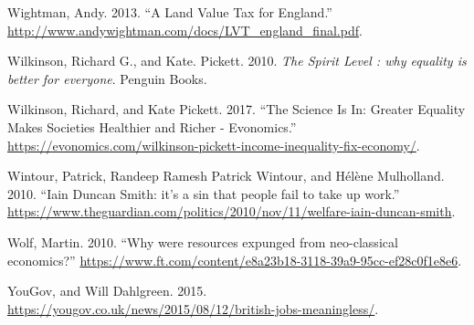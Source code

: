 \documentclass[]{tufte-handout}
\begin{document}
\leavevmode\hypertarget{ref-Wightman2013}{}%
Wightman, Andy. 2013. ``A Land Value Tax for England.''
\url{http://www.andywightman.com/docs/LVT_england_final.pdf}.

\leavevmode\hypertarget{ref-Wilkinson2010}{}%
Wilkinson, Richard G., and Kate. Pickett. 2010. \emph{The Spirit Level :
why equality is better for everyone}. Penguin Books.

\leavevmode\hypertarget{ref-Wilkinson2017}{}%
Wilkinson, Richard, and Kate Pickett. 2017. ``The Science Is In: Greater
Equality Makes Societies Healthier and Richer - Evonomics.''
\url{https://evonomics.com/wilkinson-pickett-income-inequality-fix-economy/}.

\leavevmode\hypertarget{ref-PatrickWintour2010}{}%
Wintour, Patrick, Randeep Ramesh Patrick Wintour, and Hélène Mulholland.
2010. ``Iain Duncan Smith: it's a sin that people fail to take up
work.''
\url{https://www.theguardian.com/politics/2010/nov/11/welfare-iain-duncan-smith}.

\leavevmode\hypertarget{ref-Wolf2010}{}%
Wolf, Martin. 2010. ``Why were resources expunged from neo-classical
economics?''
\url{https://www.ft.com/content/e8a23b18-3118-39a9-95cc-ef28c0f1e8e6}.

\leavevmode\hypertarget{ref-YouGov2015}{}%
YouGov, and Will Dahlgreen. 2015.
\url{https://yougov.co.uk/news/2015/08/12/british-jobs-meaningless/}.
\end{document}
